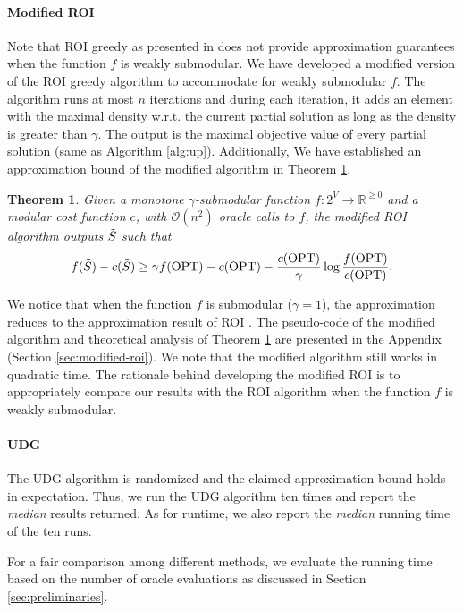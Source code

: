 \documentclass[10pt]{article} %
\newtheorem{theorem}{Theorem}
\theoremstyle{remark}
\newcommand{\OPT}{{\rm OPT}}
\begin{document}
\paragraph{\bf Modified ROI} Note that ROI greedy as presented in \cite{jin2021unconstrained} does not provide approximation guarantees when the function $f$ is weakly submodular.
We have developed a modified version of the ROI greedy algorithm to accommodate for weakly submodular $f$. The algorithm runs at most $n$ iterations and during each iteration, it adds an element with the maximal density w.r.t. the current partial solution as long as the density is greater than $\gamma$. The output is the maximal objective value of every partial solution (same as Algorithm \ref{alg:up}). Additionally, We have established an approximation bound of the modified algorithm in Theorem \ref{th:modified-roi}.
\begin{theorem}
\label{th:modified-roi}
    Given a monotone $\gamma$-submodular function $f:2^{V} \rightarrow \mathbb{R}^{\geq 0}$ and a modular cost function $c$, with $\mathcal{O}(n^2)$ oracle calls to $f$, the modified ROI algorithm outputs $\Tilde{S}$ such that
    \[f(\Tilde{S})-c(\Tilde{S}) \geq \gamma f(\OPT)-c(\OPT)- \frac{c(\OPT)}{\gamma} \log \frac{f(\OPT)}{c(\OPT)}.\]
\end{theorem}
We notice that when the function $f$ is submodular ($\gamma=1$), the approximation reduces to the approximation result of ROI \cite{jin2021unconstrained}. 
The pseudo-code of the modified algorithm and theoretical analysis of Theorem \ref{th:modified-roi} are presented in the Appendix (Section \ref{sec:modified-roi}). We note that the modified algorithm still works in quadratic time. The rationale behind developing the modified ROI is to appropriately compare our results with the ROI algorithm when the function $f$ is weakly submodular. 


\paragraph{\bf UDG} 
The UDG algorithm is randomized and the claimed approximation bound holds in expectation. Thus, we run the UDG algorithm ten times and report the \textit{median} results returned. As for runtime, we also report the \textit{median} running time of the ten runs.

For a fair comparison among different methods, we evaluate the running time based on the number of oracle evaluations as discussed in Section \ref{sec:preliminaries}. 
\end{document}
